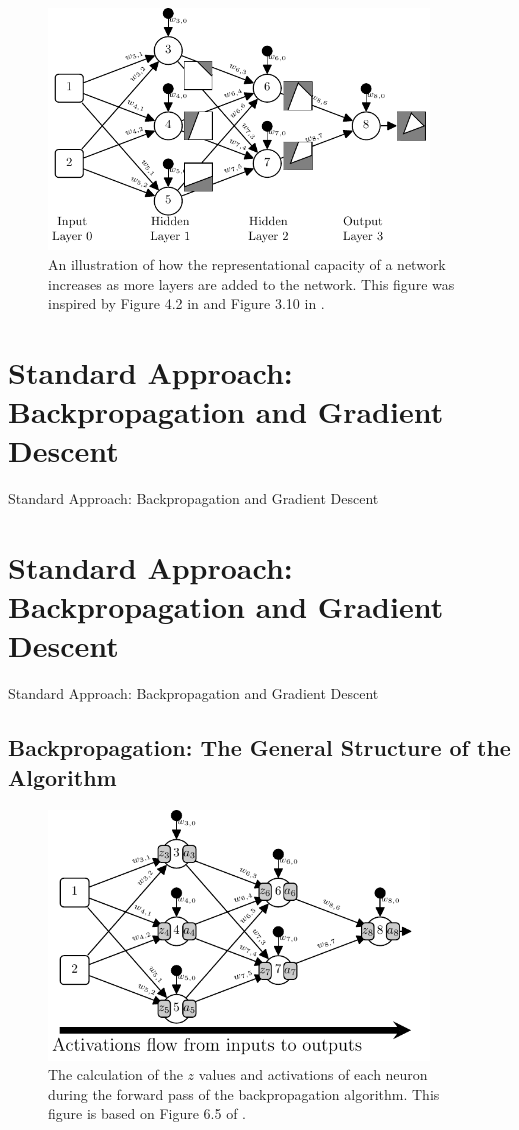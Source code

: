 \documentclass[xcolor={table}]{beamer}
\newcommand{\SectionSlide}[2][]{
	\ifthenelse{\isempty{#1}}
		{\section{#2}\begin{frame} \begin{center}\begin{huge}#2\end{huge}\end{center}\end{frame}}
		{\section[#1]{#2}\begin{frame} \begin{center}\begin{huge}#2\end{huge}\end{center}\end{frame}}
}
\begin{document}
 \begin{frame} 
\begin{figure}[t]
\centerline{
\includegraphics[width=0.9\textwidth]{./images/fmlpda_8_10.pdf}
}
\caption{An illustration of how the representational capacity of a network increases as more layers are added to the network. This figure was inspired by Figure 4.2 in \citep{ReedMarks:1999} and Figure 3.10 in \citep{marsland2011machine}.}
\label{fig:RepCapThreeLayers}
\end{figure}
\end{frame} 


\SectionSlide{Standard Approach: Backpropagation and Gradient Descent}

\subsection{Backpropagation: The General Structure of the Algorithm}

 \begin{frame} 
\begin{figure}[t]
\centerline{
\includegraphics[width=0.9\textwidth]{./images/fmlpda_8_11.pdf}
}
\caption{The calculation of the $z$ values and activations of each neuron during the forward pass of the backpropagation algorithm. This figure is based on Figure 6.5 of \citep{kelleher:2019}.}
\label{fig:BPropForward}
\end{figure}
\end{frame} 
\end{document}
